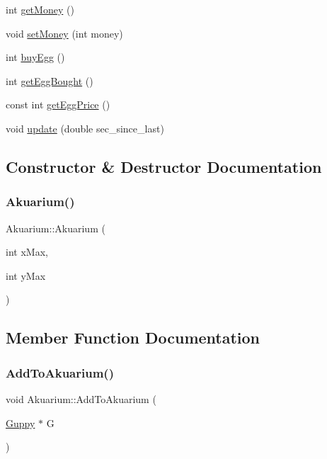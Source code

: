 \begin{DoxyCompactItemize}
\item 
int \mbox{\hyperlink{class_akuarium_a641dd24ff82bc9eab91c119cef4ac06c}{get\+Money}} ()
\item 
void \mbox{\hyperlink{class_akuarium_a6be2d50883019668db71ef5128851202}{set\+Money}} (int money)
\item 
int \mbox{\hyperlink{class_akuarium_ab68614c24c06e011b93cc5d03103f352}{buy\+Egg}} ()
\item 
int \mbox{\hyperlink{class_akuarium_ad5c60aa9ac76b1af2de9ed50765ef9cf}{get\+Egg\+Bought}} ()
\item 
const int \mbox{\hyperlink{class_akuarium_a45b387e510e5a938017908a63d22283c}{get\+Egg\+Price}} ()
\item 
void \mbox{\hyperlink{class_akuarium_af7c9d5e5b90bd3c0cef6e91777bb3978}{update}} (double sec\+\_\+since\+\_\+last)
\end{DoxyCompactItemize}


\subsection{Constructor \& Destructor Documentation}
\mbox{\label{class_akuarium_a09356fa0405a5c8db4b048665456e1ce}} 
\subsubsection{\texorpdfstring{Akuarium()}{Akuarium()}}
{\footnotesize\ttfamily Akuarium\+::\+Akuarium (\begin{DoxyParamCaption}\item[{int}]{x\+Max,  }\item[{int}]{y\+Max }\end{DoxyParamCaption})}



\subsection{Member Function Documentation}
\mbox{\label{class_akuarium_acd7f2fd40ce2ca063c3ddfacf1a84ea3}} 
\subsubsection{\texorpdfstring{Add\+To\+Akuarium()}{AddToAkuarium()}\hspace{0.1cm}{\footnotesize\ttfamily [1/4]}}
{\footnotesize\ttfamily void Akuarium\+::\+Add\+To\+Akuarium (\begin{DoxyParamCaption}\item[{\mbox{\hyperlink{class_guppy}{Guppy}} $\ast$}]{G }\end{DoxyParamCaption})}

